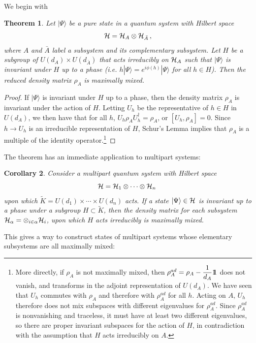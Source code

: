 \documentclass[12pt]{article}
\newtheorem{theorem}{Theorem}[section]
\newtheorem{corollary}[theorem]{Corollary}
\theoremstyle{definition}
\def\identity{{\rlap{1} \hskip 1.6pt \hbox{1}}}
\begin{document}
We begin with
\begin{theorem}
Let $|\Psi \rangle$ be a pure state in a quantum system with Hilbert space
\[
{\cal H} = {\cal H}_A  \otimes {\cal H}_{\bar{A}} \, ,
\]
where $A$ and $\bar{A}$ label a subsystem and its complementary
subsystem. Let $H$ be a subgroup of $U(d_A) \times U(d_{\bar{A}})$
that acts irreducibly on ${\cal H}_A$ such that $|\Psi \rangle$ is
invariant under $H$ up to a phase (i.e. $h|\Psi \rangle = e^{i
\phi(h)}|\Psi \rangle$ for all $h \in H$). Then the reduced density
matrix $\rho_A$ is maximally mixed.
\end{theorem}
\begin{proof}
If $|\Psi \rangle$ is invariant under $H$ up to a phase, then the density matrix $\rho_A$ is invariant under the action of $H$. Letting $U_h$ be the representative of $h \in H$ in $U(d_A)$, we then have that for all $h$, $U_h \rho_A U_h^\dagger = \rho_A$, or $[U_h, \rho_A] = 0$. Since $h \to U_h$ is an irreducible representation of $H$, Schur's Lemma implies that $\rho_A$ is a multiple of the identity operator.\footnote{More directly, if $\rho_A$ is not maximally mixed, then $\rho_A^{ad} = \rho_A - \dfrac{1}{d_A} \identity$ does not vanish, and transforms in the adjoint representation of $U(d_A)$. We have seen that $U_h$ commutes with $\rho_A$ and therefore with $\rho^{ad}_A$ for all $h$. Acting on $A$, $U_h$ therefore does not mix subspaces with different eigenvalues for $\rho^{ad}_A$. Since $\rho^{ad}_A$ is nonvanishing and traceless, it must have at least two different eigenvalues, so there are proper invariant subspaces for the action of $H$, in contradiction with the assumption that $H$ acts irreducibly on $A$.}
\end{proof}
The theorem has an immediate application to multipart systems:
\begin{corollary}
\label{cor.multipart}
Consider a multipart quantum system with Hilbert space
\[
{\cal H} = {\cal H}_1  \otimes \cdots  \otimes {\cal H}_n \;
\]
upon which $\tilde{K} = U(d_1) \times \cdots \times U(d_n)$ acts. If a state $|\Psi \rangle \in {\cal H}$ is invariant up to a phase under a subgroup $H \subset \tilde{K}$, then the density matrix for each subsystem  ${\cal H}_{\alpha} =  \otimes_{i \in \alpha} {\cal H}_i$, upon which $H$ acts irreducibly is maximally mixed.
\end{corollary}
This gives a way to construct states of multipart systems whose elementary subsystems are all maximally mixed:
\end{document}
